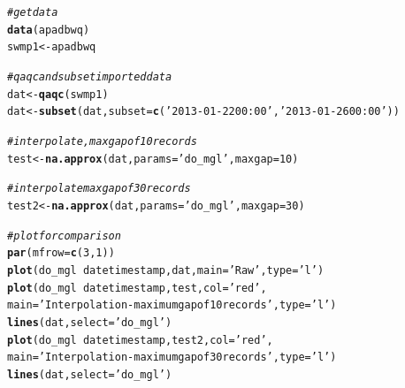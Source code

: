 \documentclass[10pt,letterpaper]{article}\usepackage[]{graphicx}\usepackage[]{color}
\makeatletter
\newcommand{\hlnum}[1]{\textcolor[rgb]{0.686,0.059,0.569}{#1}}%
\newcommand{\hlstr}[1]{\textcolor[rgb]{0.192,0.494,0.8}{#1}}%
\newcommand{\hlcom}[1]{\textcolor[rgb]{0.678,0.584,0.686}{\textit{#1}}}%
\newcommand{\hlopt}[1]{\textcolor[rgb]{0,0,0}{#1}}%
\newcommand{\hlstd}[1]{\textcolor[rgb]{0.345,0.345,0.345}{#1}}%
\newcommand{\hlkwb}[1]{\textcolor[rgb]{0.69,0.353,0.396}{#1}}%
\newcommand{\hlkwc}[1]{\textcolor[rgb]{0.333,0.667,0.333}{#1}}%
\newcommand{\hlkwd}[1]{\textcolor[rgb]{0.737,0.353,0.396}{\textbf{#1}}}%
\newenvironment{kframe}{%
 \def\at@end@of@kframe{}%
 \ifinner\ifhmode%
  \def\at@end@of@kframe{\end{minipage}}%
  \begin{minipage}{\columnwidth}%
 \fi\fi%
 \def\FrameCommand##1{\hskip\@totalleftmargin \hskip-\fboxsep
 \colorbox{shadecolor}{##1}\hskip-\fboxsep
     \hskip-\linewidth \hskip-\@totalleftmargin \hskip\columnwidth}%
 \MakeFramed {\advance\hsize-\width
   \@totalleftmargin\z@ \linewidth\hsize
   \@setminipage}}%
 {\par\unskip\endMakeFramed%
 \at@end@of@kframe}
\newenvironment{knitrout}{}{} %
\makeatother
\begin{document}
\begin{knitrout}
\color{fgcolor}\begin{kframe}
\begin{alltt}
\hlcom{# get data}
\hlkwd{data}\hlstd{(apadbwq)}
\hlstd{swmp1} \hlkwb{<-} \hlstd{apadbwq}

\hlcom{# qaqc and subset imported data}
\hlstd{dat} \hlkwb{<-} \hlkwd{qaqc}\hlstd{(swmp1)}
\hlstd{dat} \hlkwb{<-} \hlkwd{subset}\hlstd{(dat,} \hlkwc{subset} \hlstd{=} \hlkwd{c}\hlstd{(}\hlstr{'2013-01-22 00:00'}\hlstd{,} \hlstr{'2013-01-26 00:00'}\hlstd{))}

\hlcom{# interpolate, maxgap of 10 records}
\hlstd{test} \hlkwb{<-} \hlkwd{na.approx}\hlstd{(dat,} \hlkwc{params} \hlstd{=} \hlstr{'do_mgl'}\hlstd{,} \hlkwc{maxgap} \hlstd{=} \hlnum{10}\hlstd{)}

\hlcom{# interpolate maxgap of 30 records}
\hlstd{test2} \hlkwb{<-} \hlkwd{na.approx}\hlstd{(dat,} \hlkwc{params} \hlstd{=} \hlstr{'do_mgl'}\hlstd{,} \hlkwc{maxgap} \hlstd{=} \hlnum{30}\hlstd{)}

\hlcom{# plot for comparison}
\hlkwd{par}\hlstd{(}\hlkwc{mfrow} \hlstd{=} \hlkwd{c}\hlstd{(}\hlnum{3}\hlstd{,} \hlnum{1}\hlstd{))}
\hlkwd{plot}\hlstd{(do_mgl} \hlopt{~} \hlstd{datetimestamp, dat,} \hlkwc{main} \hlstd{=} \hlstr{'Raw'}\hlstd{,} \hlkwc{type} \hlstd{=} \hlstr{'l'}\hlstd{)}
\hlkwd{plot}\hlstd{(do_mgl} \hlopt{~} \hlstd{datetimestamp, test,} \hlkwc{col} \hlstd{=} \hlstr{'red'}\hlstd{,}
  \hlkwc{main} \hlstd{=} \hlstr{'Interpolation - maximum gap of 10 records'}\hlstd{,} \hlkwc{type} \hlstd{=} \hlstr{'l'}\hlstd{)}
\hlkwd{lines}\hlstd{(dat,} \hlkwc{select} \hlstd{=} \hlstr{'do_mgl'}\hlstd{)}
\hlkwd{plot}\hlstd{(do_mgl} \hlopt{~} \hlstd{datetimestamp, test2,} \hlkwc{col} \hlstd{=} \hlstr{'red'}\hlstd{,}
  \hlkwc{main} \hlstd{=} \hlstr{'Interpolation - maximum gap of 30 records'}\hlstd{,} \hlkwc{type} \hlstd{=} \hlstr{'l'}\hlstd{)}
\hlkwd{lines}\hlstd{(dat,} \hlkwc{select} \hlstd{=} \hlstr{'do_mgl'}\hlstd{)}
\end{alltt}
\end{kframe}\begin{figure}[!ht]



\end{figure}
\end{knitrout}
\end{document}
